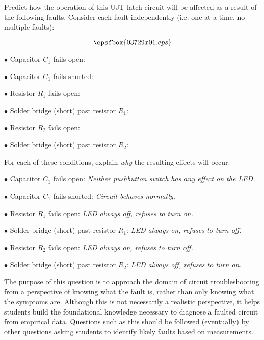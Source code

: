 

Predict how the operation of this UJT latch circuit will be affected as a result of the following faults.  Consider each fault independently (i.e. one at a time, no multiple faults):

$$\epsfbox{03729x01.eps}$$

\medskip
\item{$\bullet$} Capacitor $C_1$ fails open:
\vskip 5pt
\item{$\bullet$} Capacitor $C_1$ fails shorted:
\vskip 5pt
\item{$\bullet$} Resistor $R_1$ fails open:
\vskip 5pt
\item{$\bullet$} Solder bridge (short) past resistor $R_1$:
\vskip 5pt
\item{$\bullet$} Resistor $R_2$ fails open:
\vskip 5pt
\item{$\bullet$} Solder bridge (short) past resistor $R_2$:
\medskip

For each of these conditions, explain {\it why} the resulting effects will occur.







\medskip
\item{$\bullet$} Capacitor $C_1$ fails open: {\it Neither pushbutton switch has any effect on the LED.}
\vskip 5pt
\item{$\bullet$} Capacitor $C_1$ fails shorted: {\it Circuit behaves normally.}
\vskip 5pt
\item{$\bullet$} Resistor $R_1$ fails open: {\it LED always off, refuses to turn on.}
\vskip 5pt
\item{$\bullet$} Solder bridge (short) past resistor $R_1$: {\it LED always on, refuses to turn off.}
\vskip 5pt
\item{$\bullet$} Resistor $R_2$ fails open: {\it LED always on, refuses to turn off.}
\vskip 5pt
\item{$\bullet$} Solder bridge (short) past resistor $R_2$: {\it LED always off, refuses to turn on.}
\medskip







The purpose of this question is to approach the domain of circuit troubleshooting from a perspective of knowing what the fault is, rather than only knowing what the symptoms are.  Although this is not necessarily a realistic perspective, it helps students build the foundational knowledge necessary to diagnose a faulted circuit from empirical data.  Questions such as this should be followed (eventually) by other questions asking students to identify likely faults based on measurements.




